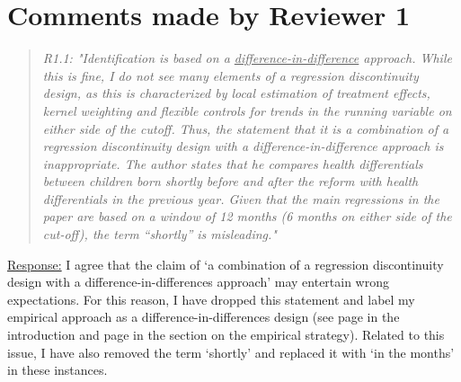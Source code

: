 
\clearpage
\section{Comments made by Reviewer 1}


\bigskip
{}
\begin{quote}
	\textit{R1.1: "Identification is based on a \underline{difference-in-difference} approach. While this is fine, I do not see many elements of a regression discontinuity design, as this is characterized by local estimation of treatment effects, kernel weighting and flexible controls for trends in the running variable on either side of the cutoff. Thus, the statement that it is a combination of a regression discontinuity design with a difference-in-difference approach is inappropriate. The author states that he compares health differentials between children born shortly before and after the reform with health differentials in the previous year. Given that the main regressions in the paper are based on a window of 12 months (6 months on either side of the cut-off), the term “shortly” is misleading."}
\end{quote}
\underline{Response:} I agree that the claim of `a combination of a regression discontinuity design with a difference-in-differences approach' may entertain wrong expectations. For this reason, I have dropped this statement and label my empirical approach as a difference-in-differences design (see page \pageref{rev_mlch: r1_rdd+did_intro} in the introduction and page \pageref{rev_mlch: r1_rdd+did_em_section} in the section on the empirical strategy). Related to this issue, I have also removed the term `shortly' and replaced it with `in the months' in these instances.


